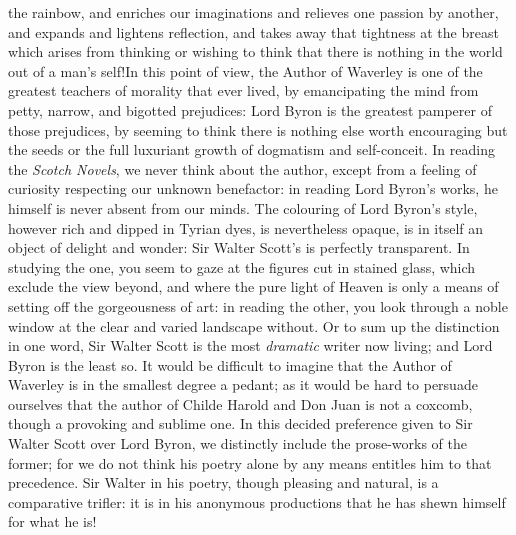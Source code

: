 the rainbow, and enriches our imaginations and relieves one passion
by another, and expands and lightens reflection, and takes away that
tightness at the breast which arises from thinking or wishing to think
that there is nothing in the world out of a man's self!\textemdash In this point
of view, the Author of Waverley is one of the greatest teachers of
morality that ever lived, by emancipating the mind from petty, narrow,
and bigotted prejudices: Lord Byron is the greatest pamperer of those
prejudices, by seeming to think there is nothing else worth encouraging
but the seeds or the full luxuriant growth of dogmatism and
self-conceit. In reading the \emph{Scotch Novels}, we never think about
the author, except from a feeling of curiosity respecting our unknown
benefactor: in reading Lord Byron's works, he himself is never absent
from our minds. The colouring of Lord Byron's style, however rich and
dipped in Tyrian dyes, is nevertheless opaque, is in itself an object
of delight and wonder: Sir Walter Scott's is perfectly transparent. In
studying the one, you seem to gaze at the figures cut in stained glass,
which exclude the view beyond, and where the pure light of Heaven is
only a means of setting off the gorgeousness of art: in reading the
other, you look through a noble window at the clear and varied landscape
without. Or to sum up the distinction in one word, Sir Walter Scott is
the most \emph{dramatic} writer now living; and Lord Byron is the least so.
It would be difficult to imagine that the Author of Waverley is in the
smallest degree a pedant; as it would be hard to persuade ourselves that
the author of Childe Harold and Don Juan is not a coxcomb, though a
provoking and sublime one. In this decided preference given to Sir
Walter Scott over Lord Byron, we distinctly include the prose-works of
the former; for we do not think his poetry alone by any means entitles
him to that precedence. Sir Walter in his poetry, though pleasing and
natural, is a comparative trifler: it is in his anonymous productions
that he has shewn himself for what he is!\textemdash 

